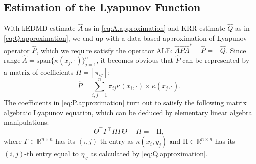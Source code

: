 \documentclass[english]{cccconf}
\newcommand{\mr}[1]{\mathrm{#1}}
\newcommand{\mbb}[1]{\mathds{#1}} %
\newcommand{\mR}{\mbb{R}}
\begin{document}
\subsection{Estimation of the Lyapunov Function}
\par With kEDMD estimate $\hat{A}$ as in \eqref{eq:A.approximation} and KRR estimate $\hat{Q}$ as in \eqref{eq:Q.approximation}, we end up with a data-based approximation of Lyapunov operator $\hat{P}$, which we require satisfy the operator ALE: $\hat{A}\hat{P}\hat{A}^\ast - \hat{P} = -\hat{Q}$. Since $\mr{range}~\hat{A} = \mr{span}\{\kappa(x_j, \cdot)\}_{j=1}^n$, it becomes obvious that $\hat{P}$ can be represented by a matrix of coefficients $\Pi = [\pi_{ij}]$:
\begin{equation}\label{eq:P.approximation}
\textstyle
    \hat{P} = \sum_{i,j=1}^n \pi_{ij}\kappa(x_i, \cdot)\times \kappa(x_j, \cdot). 
\end{equation}
The coefficients in \eqref{eq:P.approximation} turn out to satisfy the following matrix algebraic Lyapunov equation, which can be deduced by elementary linear algebra manipulations: 
\begin{equation}\label{eq:P.ale.approximation}
\textstyle
\Theta^\top \Gamma^\top \Pi \Gamma \Theta - \Pi = -\mr{H}, 
\end{equation}
where $\Gamma\in \mR^{n\times n}$ has its $(i,j)$-th entry as $\kappa(x_i, y_j)$ and $\mr{H}\in \mR^{n\times n}$ has its $(i,j)$-th entry equal to $\eta_{ij}$ as calculated by \eqref{eq:Q.approximation}. 
\end{document}
